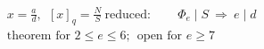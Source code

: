 \documentclass{article}
\begin{document}
\[
\begin{aligned}
&x=\tfrac ad,\ \ [x]_q=\tfrac{N}{S}\ \text{reduced}:\qquad \Phi_e\mid S\ \Longrightarrow\ e\mid d\\
&\text{theorem for }2\le e\le6;\ \ \text{open for }e\ge7
\end{aligned}
\]
\end{document}
